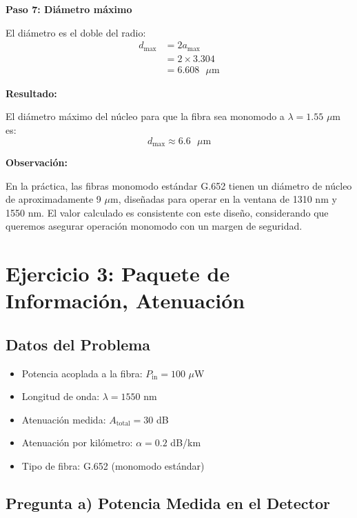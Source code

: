 \documentclass[11pt,a4paper]{article}
\begin{document}
\textbf{Paso 7: Diámetro máximo}

El diámetro es el doble del radio:
\begin{align}
    d_{\max} &= 2a_{\max} \\
    &= 2 \times 3.304 \\
    &= 6.608 \text{ }\mu\text{m}
\end{align}

\textbf{Resultado:}

El diámetro máximo del núcleo para que la fibra sea monomodo a $\lambda = 1.55$ $\mu$m es:
\begin{equation}
    d_{\max} \approx 6.6 \text{ }\mu\text{m}
\end{equation}

\textbf{Observación:}

En la práctica, las fibras monomodo estándar G.652 tienen un diámetro de núcleo de aproximadamente 9 $\mu$m, diseñadas para operar en la ventana de 1310 nm y 1550 nm. El valor calculado es consistente con este diseño, considerando que queremos asegurar operación monomodo con un margen de seguridad.

\section{Ejercicio 3: Paquete de Información, Atenuación}

\subsection{Datos del Problema}

\begin{itemize}
    \item Potencia acoplada a la fibra: $P_{\text{in}} = 100$ $\mu$W
    \item Longitud de onda: $\lambda = 1550$ nm
    \item Atenuación medida: $A_{\text{total}} = 30$ dB
    \item Atenuación por kilómetro: $\alpha = 0.2$ dB/km
    \item Tipo de fibra: G.652 (monomodo estándar)
\end{itemize}

\subsection{Pregunta a) Potencia Medida en el Detector}
\end{document}
